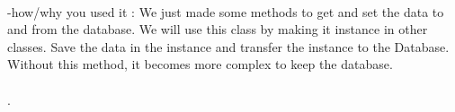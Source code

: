\documentclass[conference]{IEEEtran}
\begin{document}
\\ -how/why you used it : We just made some methods to get and set the data to and from the database. We will use this class by making it instance in other classes. Save the data in the instance and transfer the instance to the Database. Without this method, it becomes more complex to keep the database.\\\\.\\\\\\\\\\\\\\\\\\\\\\\\\\\\\\\\\\\\\\\\\\\\\\\\\\\\\\\\\\\\\\\\\\\\\\\\\\\\\\\\\\\\\\\\\\\\\\\\\\\\\\\\\\\\\\\\\\\\\\\\\\\\\\\\\\\\\\\\\\\\\\\\\\\\\\\\\\\\\\\\\\\\\\\\\\\\\\\\\\\\\\

\section{Use Cases}

\begin{figure}[htbp]
\begin{center}
    \includegraphics[scale=0.75]{img_flowchart}
    \caption{Application Flowchart} 
\end{center}
\end{figure}



.\\\\\\\\\\\\\\\\\\\\\\\\\\\\\\\\\\\\\\\\\\\\\\\\\\\\\\\\\\\\\\\\\\\\\\\\\\\\\\\\\\\\\\\\\\\\\\\\\\\\\\\\\\\\\\\\\\\\\\\\\\\\\\\\\\

\begin{figure}[htbp]
\begin{center}
    \includegraphics[scale=0.5]{img_serverFlowchart}
    \caption{Server Flowchart} 
\end{center}
\end{figure}

.\\\\\\\\\\\\\\\\\\\\\\\\\\\\\\\\\\\\\\\\\\\\\\\\\\\\\\\\\\\\\\\\\\\\\\\\\\\\\\\\\\\\\\\\\\\\\\\\\\\\\\\\\\\\\\\\\\\\\\\\\\\\\\\\\\
-1) BLE searching and push notice
\begin{figure}[htbp]
\begin{center}
    \includegraphics[scale=0.2]{img_capture01}
    \caption{BLE searching and push notice} 
\end{center}
\end{figure}\\
\quad If User turn on the bluetooth module, smartphone finds the BLE signal, and then Server sends to notice that information data about Exhibition is downloaded. If user touch the push notice, then temporary activity is open.\\\\\\\\\\\

-2) Temporary Activity01 \\
\begin{figure}[htbp]
\begin{center}
    \includegraphics[scale=0.2]{img_capture02}
    \caption{Temporary Activity 01} 
\end{center}
\end{figure}\\
\quad 
\end{document}
